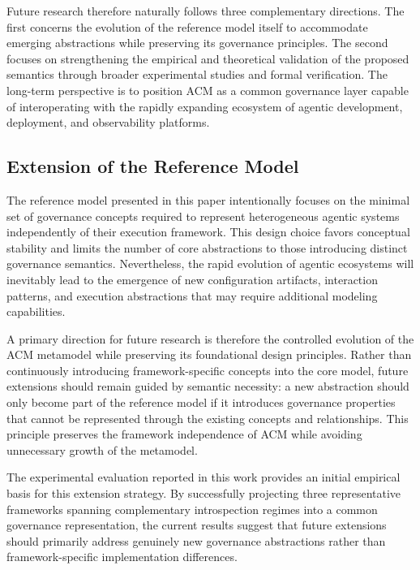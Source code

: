 \documentclass[10pt]{article}
\begin{document}
Future research therefore naturally follows three complementary directions. The first concerns the evolution of the reference model itself to accommodate emerging abstractions while preserving its governance principles. The second focuses on strengthening the empirical and theoretical validation of the proposed semantics through broader experimental studies and formal verification. The long-term perspective is to position ACM as a common governance layer capable of interoperating with the rapidly expanding ecosystem of agentic development, deployment, and observability platforms.

\subsection{Extension of the Reference Model}
\label{sec:future_reference_model}

The reference model presented in this paper intentionally focuses on the minimal set of governance concepts required to represent heterogeneous agentic systems independently of their execution framework. This design choice favors conceptual stability and limits the number of core abstractions to those introducing distinct governance semantics. Nevertheless, the rapid evolution of agentic ecosystems will inevitably lead to the emergence of new configuration artifacts, interaction patterns, and execution abstractions that may require additional modeling capabilities.

A primary direction for future research is therefore the controlled evolution of the ACM metamodel while preserving its foundational design principles. Rather than continuously introducing framework-specific concepts into the core model, future extensions should remain guided by semantic necessity: a new abstraction should only become part of the reference model if it introduces governance properties that cannot be represented through the existing concepts and relationships. This principle preserves the framework independence of ACM while avoiding unnecessary growth of the metamodel.

The experimental evaluation reported in this work provides an initial empirical basis for this extension strategy. By successfully projecting three representative frameworks spanning complementary introspection regimes into a common governance representation, the current results suggest that future extensions should primarily address genuinely new governance abstractions rather than framework-specific implementation differences.
\end{document}
